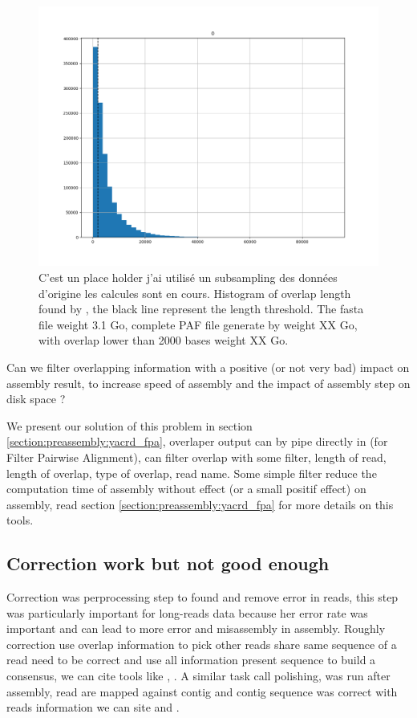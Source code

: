 \documentclass[./main.tex]{subfiles}
\begin{document}
\begin{figure}
    \centering
    \includegraphics[width=\textwidth]{introduction/images/overlap_length.png}
    \caption{C'est un place holder j'ai utilisé un subsampling des données d'origine les calcules sont en cours. Histogram of overlap length found by \minimap, the black line represent the \miniasm length threshold. The fasta file weight 3.1 Go, complete PAF file generate by \minimap weight XX Go, with overlap lower than 2000 bases weight XX Go.}
    \label{intro:fig:length_overlap_histogram}
\end{figure}

Can we filter overlapping information with a positive (or not very bad) impact on assembly result, to increase speed of assembly and the impact of assembly step on disk space ?

We present our solution of this problem \fpa in section \ref{section:preassembly:yacrd_fpa}, overlaper output can by pipe directly in \fpa (for Filter Pairwise Alignment), \fpa can filter overlap with some filter, length of read, length of overlap, type of overlap, read name. Some simple \fpa filter reduce the computation time of assembly without effect (or a small positif effect) on assembly, read section \ref{section:preassembly:yacrd_fpa} for more details on this tools.

\subsection{Correction work but not good enough}

Correction was perprocessing step to found and remove error in reads, this step was particularly important for long-reads data because her error rate was important and can lead to more error and misassembly in assembly. Roughly correction use overlap information to pick other reads share same sequence of a read need to be correct and use all information present sequence to build a consensus, we can cite tools like \cite{MECAT}, \cite{CONSENT}. A similar task call polishing, was run after assembly, read are mapped against contig and contig sequence was correct with reads information we can site \cite{racon} and .
\end{document}
